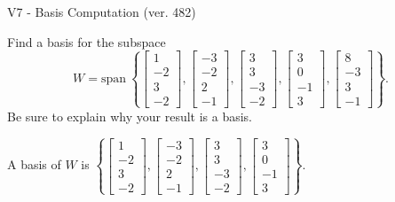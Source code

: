 \begin{exercise}
  \begin{exerciseTitle}V7 - Basis Computation (ver. 482)\end{exerciseTitle}
  \begin{exerciseStatement}
    Find a basis for the subspace 
\[W=\mathrm{span}\ \left\{\left[\begin{array}{r}
1 \\
-2 \\
3 \\
-2
\end{array}\right] , \left[\begin{array}{r}
-3 \\
-2 \\
2 \\
-1
\end{array}\right] , \left[\begin{array}{r}
3 \\
3 \\
-3 \\
-2
\end{array}\right] , \left[\begin{array}{r}
3 \\
0 \\
-1 \\
3
\end{array}\right] , \left[\begin{array}{r}
8 \\
-3 \\
3 \\
-1
\end{array}\right]\right\}.\]
 Be sure to explain why your result is a basis.


  \end{exerciseStatement}
  \begin{exerciseAnswer}
   A basis of \(W\) is  \(\left\{\left[\begin{array}{r}
1 \\
-2 \\
3 \\
-2
\end{array}\right] , \left[\begin{array}{r}
-3 \\
-2 \\
2 \\
-1
\end{array}\right] , \left[\begin{array}{r}
3 \\
3 \\
-3 \\
-2
\end{array}\right] , \left[\begin{array}{r}
3 \\
0 \\
-1 \\
3
\end{array}\right]\right\}\).
  


  \end{exerciseAnswer}
\end{exercise}